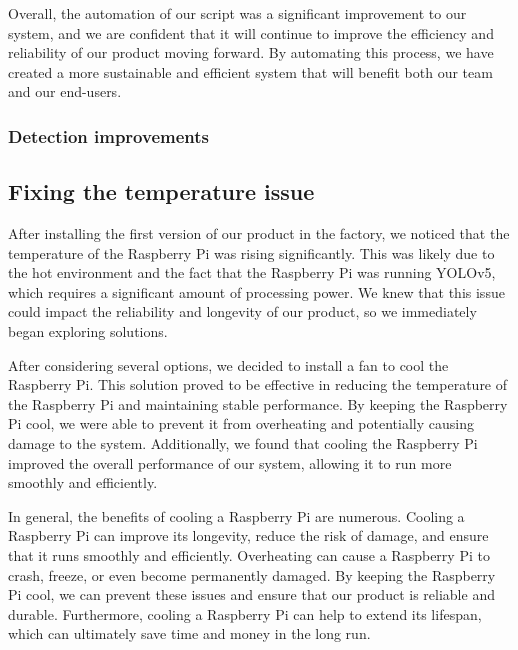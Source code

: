 Overall, the automation of our script was a significant improvement to our system, and we are confident that it will continue to improve the efficiency and reliability of our product moving forward. By automating this process, we have created a more sustainable and efficient system that will benefit both our team and our end-users.
\subsubsection{Detection improvements}
\subsection{Fixing the temperature issue}
After installing the first version of our product in the factory, we noticed that the temperature of the Raspberry Pi was rising significantly. This was likely due to the hot environment and the fact that the Raspberry Pi was running YOLOv5, which requires a significant amount of processing power. We knew that this issue could impact the reliability and longevity of our product, so we immediately began exploring solutions.

After considering several options, we decided to install a fan to cool the Raspberry Pi. This solution proved to be effective in reducing the temperature of the Raspberry Pi and maintaining stable performance. By keeping the Raspberry Pi cool, we were able to prevent it from overheating and potentially causing damage to the system. Additionally, we found that cooling the Raspberry Pi improved the overall performance of our system, allowing it to run more smoothly and efficiently.

In general, the benefits of cooling a Raspberry Pi are numerous. Cooling a Raspberry Pi can improve its longevity, reduce the risk of damage, and ensure that it runs smoothly and efficiently. Overheating can cause a Raspberry Pi to crash, freeze, or even become permanently damaged. By keeping the Raspberry Pi cool, we can prevent these issues and ensure that our product is reliable and durable. Furthermore, cooling a Raspberry Pi can help to extend its lifespan, which can ultimately save time and money in the long run.


%




%